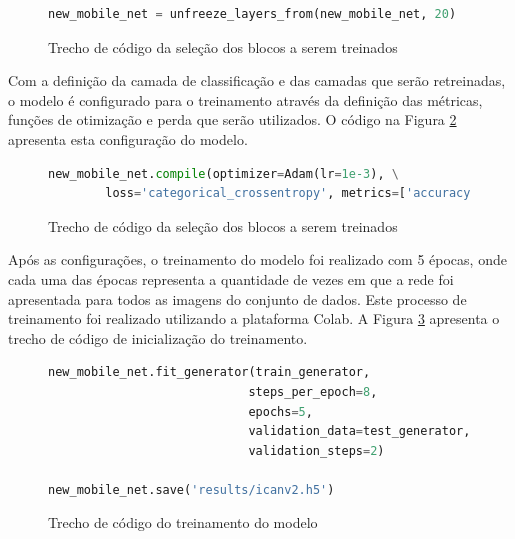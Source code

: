 \begin{figure}[H]
    \centering
    \caption{Trecho de código da seleção dos blocos a serem treinados}
    \begin{lstlisting}[language=Python]
new_mobile_net = unfreeze_layers_from(new_mobile_net, 20)
    \end{lstlisting}
    \label{figure:descongelamento_modelo}
\end{figure}

\par Com a definição da camada de classificação e das camadas que serão retreinadas, o modelo é configurado para o treinamento através da definição das métricas, funções de otimização e perda que serão utilizados. O código na Figura \ref{figure:configuracao_do_modelo_para_treino} apresenta esta configuração do modelo.

\begin{figure}[H]
    \centering
    \caption{Trecho de código da seleção dos blocos a serem treinados}
    \begin{lstlisting}[language=Python]
new_mobile_net.compile(optimizer=Adam(lr=1e-3), \
        loss='categorical_crossentropy', metrics=['accuracy'])
    \end{lstlisting}
    \label{figure:configuracao_do_modelo_para_treino}
\end{figure}

\par Após as configurações, o treinamento do modelo foi realizado com 5 épocas, onde cada uma das épocas representa a quantidade de vezes em que a rede foi apresentada para todos as imagens do conjunto de dados. Este processo de treinamento foi realizado utilizando a plataforma Colab. A Figura \ref{figure:treinamento_do_modelo} apresenta o trecho de código de inicialização do treinamento.

\begin{figure}[H]
    \centering
    \caption{Trecho de código do treinamento do modelo}
    \begin{lstlisting}[language=Python]
new_mobile_net.fit_generator(train_generator,
                            steps_per_epoch=8,
                            epochs=5,
                            validation_data=test_generator,
                            validation_steps=2)

new_mobile_net.save('results/icanv2.h5')
    \end{lstlisting}
    \label{figure:treinamento_do_modelo}
\end{figure}

